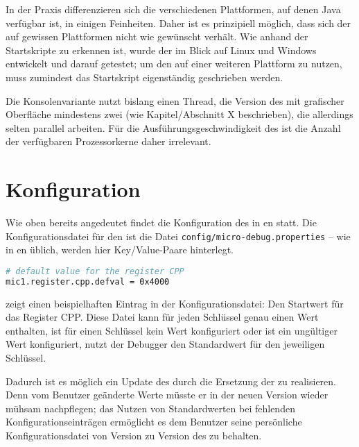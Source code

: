 In der Praxis differenzieren sich die verschiedenen Plattformen, auf denen Java verfügbar ist, in einigen Feinheiten. Daher ist es prinzipiell möglich, dass sich der \md{} auf gewissen Plattformen nicht wie gewünscht verhält. Wie anhand der Startskripte zu erkennen ist, wurde der \md{} im Blick auf Linux und Windows entwickelt und darauf getestet; um den \md{} auf einer weiteren Plattform zu nutzen, muss zumindest das Startskript eigenständig geschrieben werden.

Die Konsolenvariante nutzt bislang einen Thread, die Version des \md{} mit grafischer Oberfläche mindestens zwei (wie Kapitel/Abschnitt X beschrieben), die allerdings selten parallel arbeiten. Für die Ausführungsgeschwindigkeit des \md{} ist die Anzahl der verfügbaren Prozessorkerne daher irrelevant.

\section{Konfiguration}
Wie oben bereits angedeutet findet die Konfiguration des \md{} in en statt. Die Konfigurationsdatei für den \md{} ist die Datei \texttt{config/micro-debug.properties} -- wie in en üblich, werden hier Key/Value-Paare hinterlegt.

\begin{lstlisting}[language=sh,caption={Eintrag in \texttt{conf/micro-debug.properties}},label=\lstlbl{md-props-entry}]
# default value for the register CPP
mic1.register.cpp.defval = 0x4000
\end{lstlisting}

 zeigt einen beispielhaften Eintrag in der Konfigurationsdatei: Den Startwert für das Register CPP. Diese Datei kann für jeden Schlüssel genau einen Wert enthalten, ist für einen Schlüssel kein Wert konfiguriert oder ist ein ungültiger Wert konfiguriert, nutzt der Debugger den Standardwert für den jeweiligen Schlüssel.

Dadurch ist es möglich ein Update des \md{} durch die Ersetzung der  zu realisieren. Denn vom Benutzer geänderte Werte müsste er in der neuen Version wieder mühsam nachpflegen; das Nutzen von Standardwerten bei fehlenden Konfigurationseinträgen ermöglicht es dem Benutzer seine persönliche Konfigurationsdatei von Version zu Version des \md{} zu behalten.

